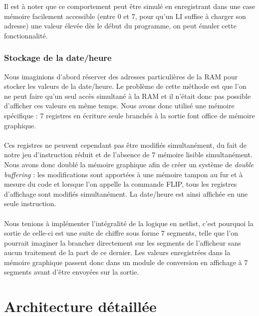 \documentclass{article}
\begin{document}
Il est à noter que ce comportement peut être simulé en enregistrant dans une case
mémoire facilement accessible (entre 0 et 7, pour qu'un LI suffise à charger son
adresse) une valeur élevée dès le début du programme, on peut émuler cette fonctionnalité.

\subsubsection{Stockage de la date/heure}
Nous imaginions d'abord réserver des adresses particulières de la RAM pour
stocker les valeurs de la date/heure. Le problème de cette méthode est que l'on
ne peut faire qu'un seul accès simultané à la RAM et il n'était donc pas possible
d'afficher ces valeurs en même temps. Nous avons donc utilisé une mémoire
spécifique : 7 registres en écriture seule branchés à la sortie font office
de mémoire graphique.

\paragraph{}
Ces registres ne peuvent cependant pas être modifiés simultanément, du fait de
notre jeu d'instruction réduit et de l'absence de 7 mémoire lisible simultanément.
Nous avons donc doublé la mémoire graphique afin de créer un système de \emph{double
buffering} : les modifications sont apportées à une mémoire tampon au fur et à mesure
du code et lorsque l'on appelle la commande FLIP, tous les registres d'affichage
sont modifiés simultanément. La date/heure est ainsi affichée en une seule instruction.

\paragraph{}
Nous tenions à implémenter l'intégralité de la logique en netlist, c'est pourquoi
la sortie de celle-ci est une suite de chiffre sous forme 7 segments, telle que l'on
pourrait imaginer la brancher directement sur les segments de l'afficheur sans
aucun traitement de la part de ce dernier. Les valeurs enregistrées dans la mémoire
graphique passent donc dans un module de conversion en affichage à 7 segments avant
d'être envoyées sur la sortie.


\section{Architecture détaillée}
\end{document}
